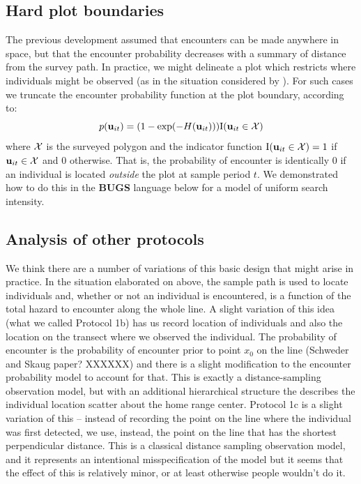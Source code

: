 \subsection{Hard plot boundaries}

The previous development assumed that encounters can be made anywhere
in space, but that the encounter probability decreases with a summary
of distance from the survey path. In practice, we might delineate a
plot which restricts where individuals might be observed (as in the
situation considered by \citet{royle_young:2008}).  For such cases we
truncate the encounter probability function at the plot boundary,
according to:
\begin{equation}
p({\bf u}_{it}) = (1- \exp(-H({\bf u}_{it}))) \mbox{I}({\bf u}_{it} \in {\cal X})
\label{search-encounter.eq.hardplot}
\end{equation}
where ${\cal X}$ is the surveyed polygon and the indicator function
$\mbox{I}({\bf u}_{it} \in {\cal X}) = 1$ if ${\bf u}_{it} \in {\cal
  X}$ and 0 otherwise.  That is, the probability of encounter is
identically 0 if an individual is located {\it outside} the plot at
sample period $t$.  We demonstrated how to do this in the {\bf BUGS}
language below for a model of uniform search intensity.



\subsection{Analysis of other protocols}


We think there are a number of variations of this basic design that
might arise in practice. 
In the situation elaborated on above, 
the sample path is used to locate individuals and, whether or not an
individual is encountered, is a function of the total hazard to
encounter along the whole line.
A slight variation of this idea (what we called Protocol 1b)
has us record location of individuals and also the location on the 
transect where we observed the individual. 
The probability of encounter is the probability of encounter prior to
point $x_{0}$ on the line (Schweder and Skaug paper? XXXXXX) and there
is a slight modification to the encounter probability model to account
for that. This is exactly a 
 distance-sampling observation model, but with an 
additional hierarchical structure the describes the individual
location scatter about the home range center.
Protocol 1c is a slight variation of this -- instead of recording the
point on the line where the individual was first detected, we use,
instead, the point on the line that has the shortest perpendicular
distance. This is a classical distance sampling observation model, and
it  represents an intentional misspecification of the model
but it seems that the effect of this is relatively minor, or at least
otherwise people wouldn't do it. 

